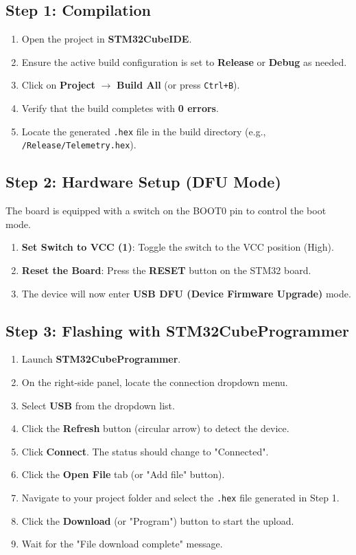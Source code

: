 \documentclass[11pt,a4paper]{article}
\begin{document}
\subsection{Step 1: Compilation}
\begin{enumerate}
    \item Open the project in \textbf{STM32CubeIDE}.
    \item Ensure the active build configuration is set to \textbf{Release} or \textbf{Debug} as needed.
    \item Click on \textbf{Project} $\rightarrow$ \textbf{Build All} (or press \texttt{Ctrl+B}).
    \item Verify that the build completes with \textbf{0 errors}.
    \item Locate the generated \texttt{.hex} file in the build directory (e.g., \texttt{/Release/Telemetry.hex}).
\end{enumerate}

\subsection{Step 2: Hardware Setup (DFU Mode)}
The board is equipped with a switch on the BOOT0 pin to control the boot mode.

\begin{enumerate}
    \item \textbf{Set Switch to VCC (1)}: Toggle the switch to the VCC position (High).
    \item \textbf{Reset the Board}: Press the \textbf{RESET} button on the STM32 board.
    \item The device will now enter \textbf{USB DFU (Device Firmware Upgrade)} mode.
\end{enumerate}

\subsection{Step 3: Flashing with STM32CubeProgrammer}
\begin{enumerate}
    \item Launch \textbf{STM32CubeProgrammer}.
    \item On the right-side panel, locate the connection dropdown menu.
    \item Select \textbf{USB} from the dropdown list.
    \item Click the \textbf{Refresh} button (circular arrow) to detect the device.
    \item Click \textbf{Connect}. The status should change to "Connected".
    \item Click the \textbf{Open File} tab (or "Add file" button).
    \item Navigate to your project folder and select the \texttt{.hex} file generated in Step 1.
    \item Click the \textbf{Download} (or "Program") button to start the upload.
    \item Wait for the "File download complete" message.
\end{enumerate}
\end{document}
